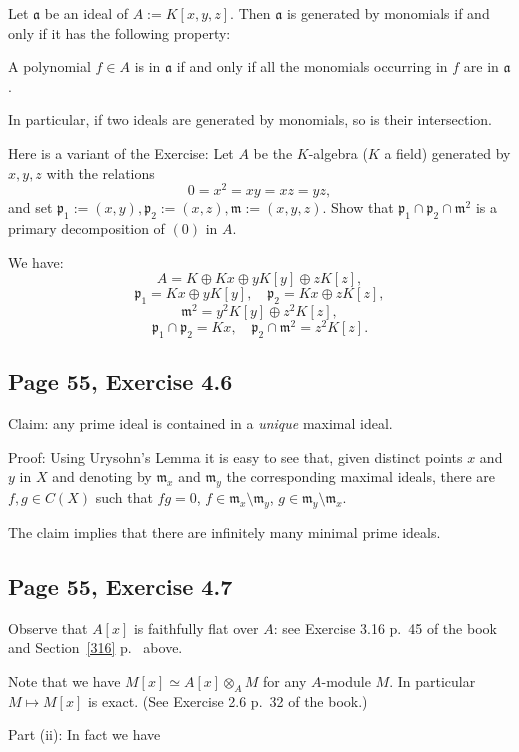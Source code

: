 \documentclass[parskip=half,fontsize=12pt]{scrartcl}%
\newcommand{\mf}{\mathfrak}
\newcommand{\aaa}{\mf a}
\newcommand{\mmm}{\mf m}
\newcommand{\ppp}{\mf p}
\begin{document}
Let $\aaa$ be an ideal of $A:=K[x,y,z]$. Then $\aaa$ is generated by monomials if and only if it has the following property:

A polynomial $f\in A$ is in $\aaa$ if and only if all the monomials occurring in $f$ are in $\aaa$.

In particular, if two ideals are generated by monomials, so is their intersection.

Here is a variant of the Exercise: Let $A$ be the $K$-algebra ($K$ a field) generated by $x,y,z$ with the relations 
$$
0=x^2=xy=xz=yz,
$$ 
and set $\ppp_1:=(x,y),\ppp_2:=(x,z),\mmm:=(x,y,z)$. Show that $\ppp_1\cap\ppp_2\cap\mmm^2$ is a primary decomposition of $(0)$ in $A$.

We have:
$$
A=K\oplus Kx\oplus yK[y]\oplus zK[z],
$$ 
$$
\ppp_1=Kx\oplus yK[y],\quad\ppp_2=Kx\oplus zK[z],
$$ 
$$
\mmm^2=y^2K[y]\oplus z^2K[z],
$$ 
$$ 
\ppp_1\cap\ppp_2=Kx,\quad\ppp_2\cap\mmm^2=z^2K[z].
$$

\subsection{Page 55, Exercise 4.6}%

Claim: any prime ideal is contained in a \emph{unique} maximal ideal.

Proof: Using Urysohn's Lemma it is easy to see that, given distinct points $x$ and $y$ in $X$ and denoting by $\mmm_x$ and $\mmm_y$ the corresponding maximal ideals, there are $f,g\in C(X)$ such that $fg=0$, $f\in\mmm_x\setminus\mmm_y$, $g\in\mmm_y\setminus\mmm_x$. 

The claim implies that there are infinitely many minimal prime ideals. %

\subsection{Page 55, Exercise 4.7}\label{5547}%

Observe that $A[x]$ is faithfully flat over $A$: see Exercise 3.16 p.~45 of the book and Section~\ref{316} p.~\pageref{316} above.

Note that we have $M[x]\simeq A[x]\otimes_AM$ for any $A$-module $M$. In particular $M\mapsto M[x]$ is exact. (See Exercise 2.6 p.~32 of the book.)

Part (ii): In fact we have 
\end{document}
